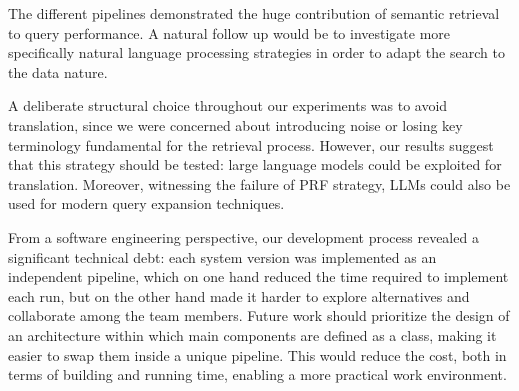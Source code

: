 \noindent The different pipelines demonstrated the huge contribution of semantic retrieval to query performance. A natural follow up would be to investigate more specifically natural language processing strategies in order to adapt the search to the data nature.

\noindent A deliberate structural choice throughout our experiments was to avoid translation, since we were concerned about introducing noise or losing key terminology fundamental for the retrieval process. However, our results suggest that this strategy should be tested: large language models could be exploited for translation. Moreover, witnessing the failure of PRF strategy, LLMs could also be used for modern query expansion techniques.

\noindent From a software engineering perspective, our development process revealed a significant technical debt: each system version was implemented as an independent pipeline, which on one hand reduced the time required to implement each run, but on the other hand made it harder to explore alternatives and collaborate among the team members. Future work should prioritize the design of an architecture within which main components are defined as a class, making it easier to swap them inside a unique pipeline. This would reduce the cost, both in terms of building and running time, enabling a more practical work environment. 